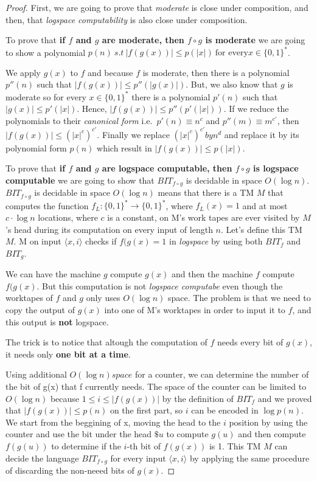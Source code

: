 \documentclass[12pt, a4paper]{article}
\begin{document}
\begin{proof}
  First, we are going to prove that \textit{moderate} is close under composition, and then, that \textit{logspace computability} is also close under composition.


  To prove that \textbf{if $f$ and $g$ are moderate, then $f \circ g$ is moderate} we are going to show a polynomial $p(n)\ s.t\ |f(g(x))| \leq p(|x|) \ \text{for every} x \in \{ 0, 1 \} ^*$.


  We apply $g(x)$ to $f$ and because $f$ is moderate, then there is a polynomial $p''(n)$ such that $|f(g(x))| \leq p''(|g(x)|)$. But, we also know that $g$ is moderate so for every $x \in \{ 0, 1 \} ^*$ there is a polynomial $p'(n)$ such that $|g(x)| \leq p'(|x|)$. Hence, $|f(g(x))| \leq p''(p'(|x|))$. If we reduce the polynomials to their \textit{canonical form} i.e.\ $p'(n) \equiv n^c $ and $p''(m) \equiv m^{c'} $, then $|f(g(x))| \leq (|x|^c)^{c'}$. Finally we replace $(|x|^c)^{c'} by n^d$ and replace it by its polynomial form $p(n)$ which result in $|f(g(x))| \leq p(|x|)$.


  To prove that \textbf{if $f$ and $g$ are logspace computable, then $f \circ g$ is logspace computable} we are going to show that $BIT_{f \circ g}$ is decidable in space $O(\log n)$. $BIT_{f \circ g}$ is decidable in space $O(\log n)$ means that there is a TM $M$ that computes the function $f_L: \{ 0,1 \} ^* \to  \{ 0,1 \} ^*$, where $f_L(x) = 1$ and at most $c \cdot \log n$ locations, where $c$ is a constant, on M's work tapes are ever visited by $M$'s head during its computation on every input of length $n$. Let's define this TM $M$. M on input $\langle x, i \rangle$ checks if $f(g(x) = 1$ in \textit{logspace} by using both $BIT_f$ and $BIT_g$.


  We can have the machine $g$ compute $g(x)$ and then the machine $f$ compute $f(g(x)$. But this computation is not \textit{logspace computabe} even though the worktapes of $f$ and $g$ only uses $O(\log n)$ space. The problem is that we need to copy the output of $g(x)$ into one of M's worktapes in order to input it to $f$, and this output is \textbf{not} logspace.


  The trick is to notice that altough the computation of $f$ needs every bit of $g(x)$, it needs only \textbf{one bit at a time}.


  Using additional $O(\log n) space$ for a counter, we can determine the number of the bit of g(x) that f currently needs. The space of the counter can be limited to $O(\log n)$ because $1 \leq i \leq |f(g(x))|$ by the definition of $BIT_f$ and we proved that $|f(g(x))| \leq p(n)$ on the first part, so $i$ can be encoded in $\log p(n)$. We start from the beggining of x, moving the head to the $i$ position by using the counter and use the bit under the head $\$u$ to compute $g(u)$ and then compute $f(g(u))$ to determine if the $i$-th bit of $f(g(x))$ is 1. This TM $M$ can decide the language $BIT_{f \circ g}$ for every input $\langle x, i \rangle$ by applying the same procedure of discarding the non-neeed bits of $g(x)$.


\end{proof}
\end{document}
